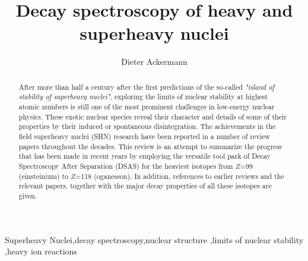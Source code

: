 	\begin{frontmatter}
		
		\title{ \vspace{1cm} Decay spectroscopy of heavy and superheavy nuclei}
		
		
		\author[mymainaddress,mysecondaryaddress]{Dieter Ackermann}
		

		
		
		\address[mymainaddress]{Grand Acc\'{e}l\'{e}rateur National d'Ions Lourds -- GANIL, CEA/DRF-CNRS/IN2P3, 55027, F-14076 Caen, France}
		
	
		\begin{abstract} After more than half a century after the first predictions of the so-called {\it "island of stability of superheavy nuclei"}, exploring the limits of nuclear stability at highest atomic numbers is still one of the most prominent challenges in low-energy nuclear physics. 
        These exotic nuclear species reveal their character and details of some of their properties by their induced or spontaneous disintegration. 
        The achievements in the field superheavy nuclei (SHN) research have been reported in a number of review papers throughout the decades. 
        This review is an attempt to summarize the progress that has been made in recent years by employing the versatile tool park of Decay Spectroscopy After Separation (DSAS) for the heaviest isotopes from $Z$=99 (einsteinium) to $Z$=118 (oganesson).
        In addition, references to earlier reviews and the relevant papers, together with the major decay properties of all these isotopes are given.
        \end{abstract}		
		\begin{keyword}
			Superheavy Nuclei\sep decay spectroscopy\sep nuclear structure \sep limits of nuclear stability \sep heavy ion reactions
			
		\end{keyword}
		
	\end{frontmatter}
	
